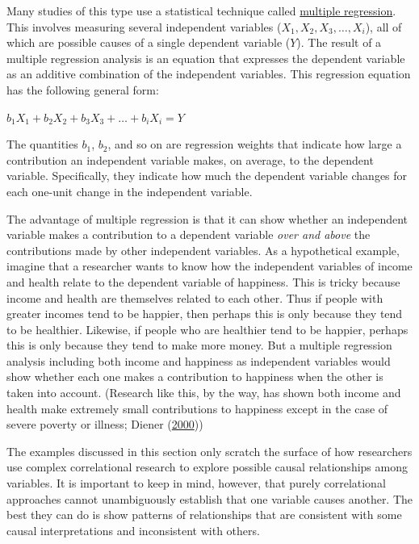 \documentclass[
]{krantz}
\begin{document}
Many studies of this type use a statistical technique called \protect\hyperlink{multiple-regression}{multiple regression}. This involves measuring several independent variables (\(X_1, X_2, X_3,…, X_i\)), all of which are possible causes of a single dependent variable (\(Y\)). The result of a multiple regression analysis is an equation that expresses the dependent variable as an additive combination of the independent variables. This regression equation has the following general form:

\(b_1X_1 + b_2X_2 + b_3X_3+ … + b_iX_i= Y\)

The quantities \(b_1\), \(b_2\), and so on are regression weights that indicate how large a contribution an independent variable makes, on average, to the dependent variable. Specifically, they indicate how much the dependent variable changes for each one-unit change in the independent variable.

The advantage of multiple regression is that it can show whether an independent variable makes a contribution to a dependent variable \emph{over and above} the contributions made by other independent variables. As a hypothetical example, imagine that a researcher wants to know how the independent variables of income and health relate to the dependent variable of happiness. This is tricky because income and health are themselves related to each other. Thus if people with greater incomes tend to be happier, then perhaps this is only because they tend to be healthier. Likewise, if people who are healthier tend to be happier, perhaps this is only because they tend to make more money. But a multiple regression analysis including both income and happiness as independent variables would show whether each one makes a contribution to happiness when the other is taken into account. (Research like this, by the way, has shown both income and health make extremely small contributions to happiness except in the case of severe poverty or illness; Diener (\protect\hyperlink{ref-diener2000subjective}{2000}))

The examples discussed in this section only scratch the surface of how researchers use complex correlational research to explore possible causal relationships among variables. It is important to keep in mind, however, that purely correlational approaches cannot unambiguously establish that one variable causes another. The best they can do is show patterns of relationships that are consistent with some causal interpretations and inconsistent with others.
\end{document}
